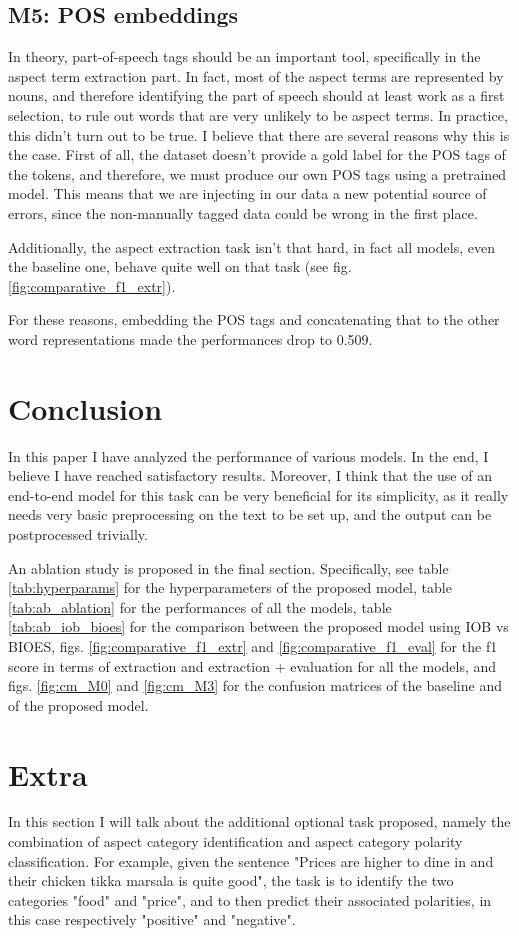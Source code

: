 \documentclass[11pt,a4paper]{article}
\begin{document}
	\subsection{M5: POS embeddings}
	In theory, part-of-speech tags should be an important tool, specifically in the
	aspect term extraction part. In fact, most of the aspect terms are represented
	by nouns, and therefore identifying the part of speech should at least work as a
	first selection, to rule out words that are very unlikely to be aspect terms. In
	practice, this didn't turn out to be true. I believe that there are several
	reasons why this is the case. First of all, the dataset doesn't provide a gold
	label for the POS tags of the tokens, and therefore, we must produce our own POS
	tags using a pretrained model. This means that we are injecting in our data a
	new potential source of errors, since the non-manually tagged data could be
	wrong in the first place.
	
	Additionally, the aspect extraction task isn't that hard, in fact all models,
	even the baseline one, behave quite well on that task (see fig.
	\ref{fig:comparative_f1_extr}).
	
	For these reasons, embedding the POS tags and concatenating that to the other
	word representations made the performances drop to 0.509.
	
	\section{Conclusion}
	In this paper I have analyzed the performance of various models. In the end, I believe I have reached satisfactory results. Moreover, I
	think that the use of an end-to-end model for this task can be very beneficial
	for its simplicity, as it really needs very basic preprocessing on the text to
	be set up, and the output can be postprocessed trivially.
	
	An ablation study is proposed in the final section. Specifically, see table \ref{tab:hyperparams} for the hyperparameters of the proposed model, table 
	\ref{tab:ab_ablation} for the performances of all the models,
	table \ref{tab:ab_iob_bioes} for the comparison between the proposed model using
	IOB vs BIOES, figs. \ref{fig:comparative_f1_extr} and
	\ref{fig:comparative_f1_eval} for the f1 score in terms
	of extraction and extraction + evaluation for all the models, and figs. \ref{fig:cm_M0} and \ref{fig:cm_M3} for the confusion matrices of the baseline and of the proposed model.
	
	\section{Extra}
	In this section I will talk about the additional optional task proposed, namely the combination of aspect category identification and aspect category polarity classification. For example, given the sentence "Prices are higher to dine in and their chicken tikka marsala is quite good", the task is to identify the two categories "food" and "price", and to then predict their associated polarities, in this case respectively "positive" and "negative".
	
\end{document}
